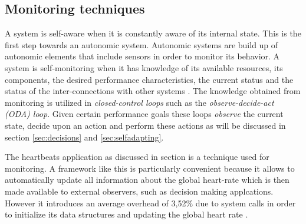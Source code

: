 \subsection{Monitoring techniques}
\label{sec:selfawareness}
A system is self-aware when it is constantly aware of its internal state. This is the first step towards an autonomic system. Autonomic systems are build up of autonomic elements that include sensors in order to monitor its behavior. A system is self-monitoring when it has knowledge of its available resources, its components, the desired performance characteristics, the current status and the status of the inter-connections with other systems \cite{autonomic}. The knowledge obtained from monitoring is utilized in \emph{closed-control loops} such as the \emph{observe-decide-act (ODA) loop}. Given certain performance goals these loops \emph{observe} the current state, decide upon an action and perform these actions as will be discussed in section \ref{sec:decisions} and \ref{sec:selfadapting}.

The heartbeats application as discussed in section \cite{sec:selfaware} is a technique used for monitoring. A framework like this is particularly convenient because it allows to automatically update all information about the global heart-rate which is then made available to external observers, such as decision making applcations. However it introduces an average overhead of 3,52\% due to system calls in order to initialize its data structures and updating the global heart rate \cite{selfaware}.